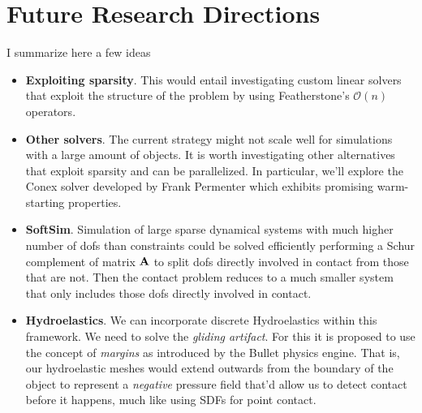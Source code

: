 \section{Future Research Directions}

I summarize here a few ideas
\begin{itemize}
	\item \textbf{Exploiting sparsity}. This would entail investigating custom
	linear solvers that exploit the structure of the problem by using
	Featherstone's $\mathcal{O}(n)$ operators.
	\item \textbf{Other solvers}. The current strategy might not scale well for
	simulations with a large amount of objects. It is worth investigating other
	alternatives that exploit sparsity and can be parallelized. In particular,
	we'll explore the Conex solver developed by Frank Permenter
	\cite{bib:permenter2020} which exhibits promising warm-starting properties.	
	\item \textbf{SoftSim}. Simulation of large sparse dynamical systems with
	much higher number of dofs than constraints could be solved efficiently
	performing a Schur complement of matrix ${\mathbf{A}}$ to split dofs directly
	involved in contact from those that are not. Then the contact problem
	reduces to a much smaller system that only includes those dofs directly
	involved in contact.
	\item \textbf{Hydroelastics}. We can incorporate discrete Hydroelastics
	within this framework. We need to solve the \textit{gliding artifact}. For
	this it is proposed to use the concept of \textit{margins} as introduced by
	the Bullet physics engine. That is, our hydroelastic meshes would extend
	outwards from the boundary of the object to represent a \textit{negative}
	pressure field that'd allow us to detect contact before it happens, much
	like using SDFs for point contact.
\end{itemize}
